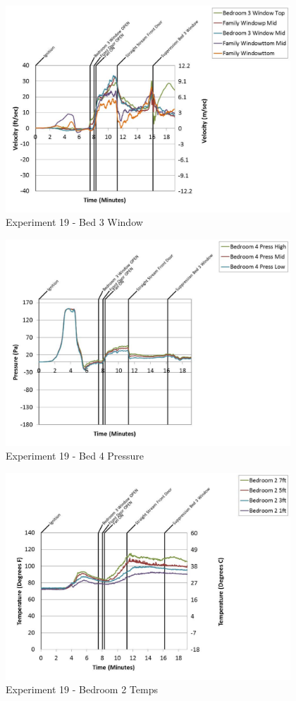 \documentclass{article}
\begin{document}
\begin{appendices}
	\clearpage

	\begin{figure}[h!]
		\centering
		\includegraphics[height=3.05in]{0_Images/Results_Charts/Exp_19_Charts/Bed3Window.pdf}
		\caption{Experiment 19 - Bed 3 Window}
	\end{figure}
 

	\begin{figure}[h!]
		\centering
		\includegraphics[height=3.05in]{0_Images/Results_Charts/Exp_19_Charts/Bed4Pressure.pdf}
		\caption{Experiment 19 - Bed 4 Pressure}
	\end{figure}
 
	\clearpage

	\begin{figure}[h!]
		\centering
		\includegraphics[height=3.05in]{0_Images/Results_Charts/Exp_19_Charts/Bedroom2Temps.pdf}
		\caption{Experiment 19 - Bedroom 2 Temps}
	\end{figure}
 


\end{appendices}
\end{document}
